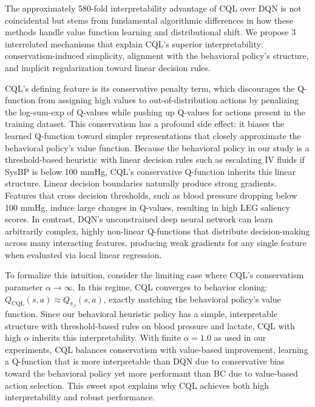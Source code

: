 The approximately 580-fold interpretability advantage of CQL over DQN is not coincidental but stems from fundamental algorithmic differences in how these methods handle value function learning and distributional shift. We propose 3 interrelated mechanisms that explain CQL's superior interpretability: conservatism-induced simplicity, alignment with the behavioral policy's structure, and implicit regularization toward linear decision rules.

CQL's defining feature is its conservative penalty term, which discourages the Q-function from assigning high values to out-of-distribution actions by penalizing the log-sum-exp of Q-values while pushing up Q-values for actions present in the training dataset. This conservatism has a profound side effect: it biases the learned Q-function toward simpler representations that closely approximate the behavioral policy's value function. Because the behavioral policy in our study is a threshold-based heuristic with linear decision rules such as escalating IV fluids if SysBP is below 100 mmHg, CQL's conservative Q-function inherits this linear structure. Linear decision boundaries naturally produce strong gradients. Features that cross decision thresholds, such as blood pressure dropping below 100 mmHg, induce large changes in Q-values, resulting in high LEG saliency scores. In contrast, DQN's unconstrained deep neural network can learn arbitrarily complex, highly non-linear Q-functions that distribute decision-making across many interacting features, producing weak gradients for any single feature when evaluated via local linear regression.

To formalize this intuition, consider the limiting case where CQL's conservatism parameter $\alpha \to \infty$. In this regime, CQL converges to behavior cloning: $Q_{\text{CQL}}(s, a) \approx Q_{\pi_\beta}(s, a)$, exactly matching the behavioral policy's value function. Since our behavioral heuristic policy has a simple, interpretable structure with threshold-based rules on blood pressure and lactate, CQL with high $\alpha$ inherits this interpretability. With finite $\alpha = 1.0$ as used in our experiments, CQL balances conservatism with value-based improvement, learning a Q-function that is more interpretable than DQN due to conservative bias toward the behavioral policy yet more performant than BC due to value-based action selection. This sweet spot explains why CQL achieves both high interpretability and robust performance.

